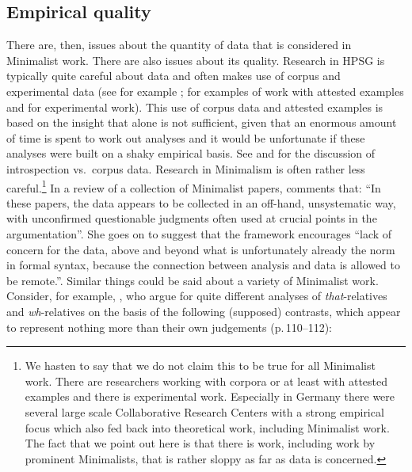 \documentclass[output=paper]{langsci/langscibook}
\begin{document}
\subsection{Empirical quality}

There are, then, issues about the quantity of data that is considered in Minimalist work. There are
also issues about its quality. Research in HPSG is typically quite careful about data and often
makes use of corpus and experimental data (see for example
\citealt*{AA2017a-u,Mueller99a,Mueller2002b,BC2010a,MBC2012a}; \citealt[Chapter~7]{VanEynde2015a-u}
for examples of work with attested examples and for experimental work).
This use of corpus data and
attested examples is based on the insight that  alone is not sufficient, given that an
enormous amount of time is spent to work out analyses and it would be unfortunate if these analyses
were built on a shaky empirical basis. See  and  for the
discussion of introspection vs.\ corpus data.
Research in Minimalism is often rather less
careful.\footnote{
 We hasten to say that we do not claim this to be true for all Minimalist work. There are
 researchers working with corpora or at least with attested examples \citep{Wurmbrand2003a} and
 there is experimental work. Especially in Germany there were several large scale Collaborative
 Research Centers with a strong empirical focus which also fed back into theoretical work, including
 Minimalist work. The fact that we point out here is that there is work, including work
 by prominent Minimalists, that is rather sloppy as far as data is concerned.%
} In a review of a collection of Minimalist papers, \citet[]{Bender2002b-u} comments that: ``In
these papers, the data appears to be collected in an off-hand, unsystematic way, with unconfirmed
questionable judgments often used at crucial points in the argumentation''. She goes on to suggest
that the framework encourages ``lack of concern for the data, above and beyond what is unfortunately
already the norm in formal syntax, because the connection between analysis and data is allowed to be
remote.''. Similar things could be said about a variety of Minimalist work. Consider, for example,
\citet{AounLi.2003}, who argue for quite different analyses of \emph{that}-relatives and
\emph{wh}-relatives on the basis of the following (supposed) contrasts, which appear to represent
nothing more than their own judgements (p.\,110--112):
\eal
{}
\label{ex:min-headway-that}
\end{document}
